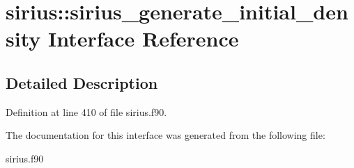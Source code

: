 \hypertarget{interfacesirius_1_1sirius__generate__initial__density}{}\section{sirius\+:\+:sirius\+\_\+generate\+\_\+initial\+\_\+density Interface Reference}
\label{interfacesirius_1_1sirius__generate__initial__density}


\subsection{Detailed Description}


Definition at line 410 of file sirius.\+f90.



The documentation for this interface was generated from the following file\+:\begin{DoxyCompactItemize}
\item 
sirius.\+f90\end{DoxyCompactItemize}
